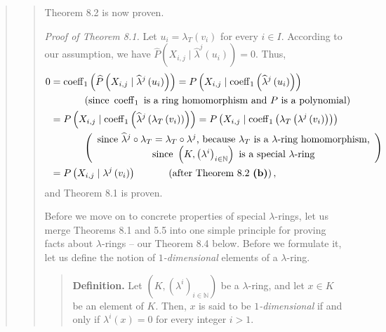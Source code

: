 \documentclass[12pt,final,notitlepage,onecolumn,german]{article}%
\begin{document}
\begin{quote}
\begin{quote}
Theorem 8.2 is now proven.

\textit{Proof of Theorem 8.1.} Let $u_{i}=\lambda_{T}\left(  v_{i}\right)  $
for every $i\in I$. According to our assumption, we have $\widehat{P}\left(
X_{i,j}\mid\widehat{\lambda}^{j}\left(  u_{i}\right)  \right)  =0$. Thus,%
\begin{align*}
0  &  =\operatorname*{coeff}\nolimits_{1}\left(  \widehat{P}\left(
X_{i,j}\mid\widehat{\lambda}^{j}\left(  u_{i}\right)  \right)  \right)
=P\left(  X_{i,j}\mid\operatorname*{coeff}\nolimits_{1}\left(  \widehat
{\lambda}^{j}\left(  u_{i}\right)  \right)  \right) \\
&  \ \ \ \ \ \ \ \ \ \ \left(  \text{since }\operatorname*{coeff}%
\nolimits_{1}\text{ is a ring homomorphism and }P\text{ is a polynomial}%
\right) \\
&  =P\left(  X_{i,j}\mid\operatorname*{coeff}\nolimits_{1}\left(
\widehat{\lambda}^{j}\left(  \lambda_{T}\left(  v_{i}\right)  \right)
\right)  \right)  =P\left(  X_{i,j}\mid\operatorname*{coeff}\nolimits_{1}%
\left(  \lambda_{T}\left(  \lambda^{j}\left(  v_{i}\right)  \right)  \right)
\right) \\
&  \ \ \ \ \ \ \ \ \ \ \left(
\begin{array}
[c]{c}%
\text{since }\widehat{\lambda}^{j}\circ\lambda_{T}=\lambda_{T}\circ\lambda
^{j}\text{, because }\lambda_{T}\text{ is a }\lambda\text{-ring homomorphism,}%
\\
\text{since }\left(  K,\left(  \lambda^{i}\right)  _{i\in\mathbb{N}}\right)
\text{ is a special }\lambda\text{-ring}%
\end{array}
\right) \\
&  =P\left(  X_{i,j}\mid\lambda^{j}\left(  v_{i}\right)  \right)
\ \ \ \ \ \ \ \ \ \ \left(  \text{after Theorem 8.2 \textbf{(b)}}\right)  ,
\end{align*}
and Theorem 8.1 is proven.

Before we move on to concrete properties of special $\lambda$-rings, let us
merge Theorems 8.1 and 5.5 into one simple principle for proving facts about
$\lambda$-rings -- our Theorem 8.4 below. Before we formulate it, let us
define the notion of $1$\textit{-dimensional} elements of a $\lambda$-ring.

\begin{quote}
\textbf{Definition.} Let $\left(  K,\left(  \lambda^{i}\right)  _{i\in
\mathbb{N}}\right)  $ be a $\lambda$-ring, and let $x\in K$ be an element of
$K$. Then, $x$ is said to be $1$\textit{-dimensional} if and only if
$\lambda^{i}\left(  x\right)  =0$ for every integer $i>1$.


\end{quote}
\end{quote}
\end{quote}
\end{document}
